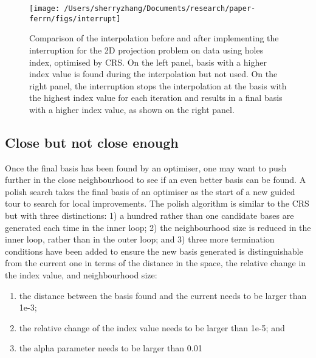 \begin{Schunk}
\begin{figure}

{\centering \texttt{[image: /Users/sherryzhang/Documents/research/paper-ferrn/figs/interrupt]} 

}

\caption[Comparison of the interpolation before and after implementing the interruption for the 2D projection problem on  data using holes index, optimised by CRS]{Comparison of the interpolation before and after implementing the interruption for the 2D projection problem on  data using holes index, optimised by CRS. On the left panel, basis with a higher index value is found during the interpolation but not used. On the right panel, the interruption stops the interpolation at the basis with the highest index value for each iteration and results in a final basis with a higher index value, as shown on the right panel.}\label{fig:interruption}
\end{figure}
\end{Schunk}

\hypertarget{close-but-not-close-enough}{%
\subsection{Close but not close
enough}\label{close-but-not-close-enough}}

Once the final basis has been found by an optimiser, one may want to
push further in the close neighbourhood to see if an even better basis
can be found. A polish search takes the final basis of an optimiser as
the start of a new guided tour to search for local improvements. The
polish algorithm is similar to the CRS but with three distinctions: 1) a
hundred rather than one candidate bases are generated each time in the
inner loop; 2) the neighbourhood size is reduced in the inner loop,
rather than in the outer loop; and 3) three more termination conditions
have been added to ensure the new basis generated is distinguishable
from the current one in terms of the distance in the space, the relative
change in the index value, and neighbourhood size:

\begin{enumerate}
\def\labelenumi{\arabic{enumi})}
\tightlist
\item
  the distance between the basis found and the current needs to be
  larger than 1e-3;
\item
  the relative change of the index value needs to be larger than 1e-5;
  and
\item
  the alpha parameter needs to be larger than 0.01
\end{enumerate}


